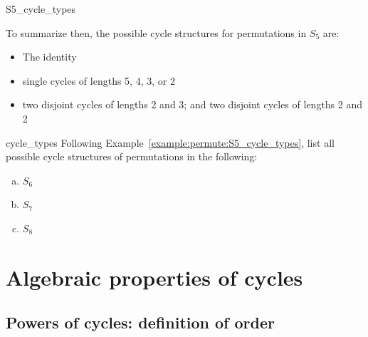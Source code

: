 \begin{example}{S5_cycle_types}

\noindent
To summarize then, the possible cycle structures for  permutations in $S_5$ are:
\begin{itemize}
\item
The identity
\item
single cycles of lengths 5, 4, 3, or 2
\item
two disjoint cycles of lengths 2 and 3;  and two disjoint cycles of lengths 2 and 2
\end{itemize}
\end{example}

\begin{exercise}{cycle_types}
Following Example~\ref{example:permute:S5_cycle_types}, list all possible cycle structures of permutations in the following:
\begin{multicols}{3}
\begin{enumerate}[(a)]
\item
$S_6$
\item
$S_7$
\item
$S_8$
\end{enumerate}
\end{multicols}
\end{exercise}

\section{Algebraic properties of cycles \quad 
{}}
\label{sec:Permutation:CycleAlgebraicProperties}

\subsection{Powers of cycles: definition of order}

